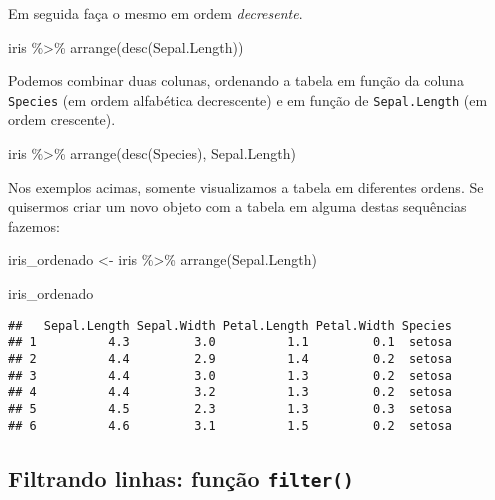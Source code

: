 \documentclass[
]{book}
\newenvironment{Shaded}{\begin{snugshade}}{\end{snugshade}}
\newcommand{\FunctionTok}[1]{\textcolor[rgb]{0.00,0.00,0.00}{#1}}
\newcommand{\NormalTok}[1]{#1}
\newcommand{\OtherTok}[1]{\textcolor[rgb]{0.56,0.35,0.01}{#1}}
\newcommand{\SpecialCharTok}[1]{\textcolor[rgb]{0.00,0.00,0.00}{#1}}
\begin{document}
Em seguida faça o mesmo em ordem \emph{decresente}.

\begin{Shaded}
\begin{Highlighting}[]
\NormalTok{iris }\SpecialCharTok{\%\textgreater{}\%} 
  \FunctionTok{arrange}\NormalTok{(}\FunctionTok{desc}\NormalTok{(Sepal.Length))}
\end{Highlighting}
\end{Shaded}

Podemos combinar duas colunas, ordenando a tabela em função da coluna \texttt{Species} (em ordem alfabética decrescente) e em função de \texttt{Sepal.Length} (em ordem crescente).

\begin{Shaded}
\begin{Highlighting}[]
\NormalTok{iris }\SpecialCharTok{\%\textgreater{}\%} 
  \FunctionTok{arrange}\NormalTok{(}\FunctionTok{desc}\NormalTok{(Species), Sepal.Length)}
\end{Highlighting}
\end{Shaded}

Nos exemplos acimas, somente visualizamos a tabela em diferentes ordens. Se quisermos criar um novo objeto com a tabela em alguma destas sequências fazemos:

\begin{Shaded}
\begin{Highlighting}[]
\NormalTok{iris\_ordenado }\OtherTok{\textless{}{-}}\NormalTok{ iris }\SpecialCharTok{\%\textgreater{}\%} 
  \FunctionTok{arrange}\NormalTok{(Sepal.Length)}

\NormalTok{iris\_ordenado}
\end{Highlighting}
\end{Shaded}

\begin{verbatim}
##   Sepal.Length Sepal.Width Petal.Length Petal.Width Species
## 1          4.3         3.0          1.1         0.1  setosa
## 2          4.4         2.9          1.4         0.2  setosa
## 3          4.4         3.0          1.3         0.2  setosa
## 4          4.4         3.2          1.3         0.2  setosa
## 5          4.5         2.3          1.3         0.3  setosa
## 6          4.6         3.1          1.5         0.2  setosa
\end{verbatim}

\hypertarget{filtrando-linhas-funuxe7uxe3o-filter}{%
\subsection{\texorpdfstring{Filtrando linhas: função \texttt{filter()}}{Filtrando linhas: função filter()}}\label{filtrando-linhas-funuxe7uxe3o-filter}}
\end{document}
